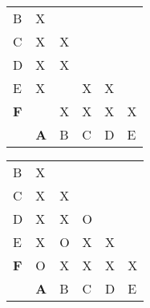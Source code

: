 \begin{figure}[t]

\begin{subfigure}[b]{.5\linewidth}
\centering
\begin{tabular}{llllll}
\cline{2-2}
\multicolumn{1}{l|}{B}          & \multicolumn{1}{l|}{X} &                        &                        &                        &                        \\ \cline{2-3}
\multicolumn{1}{l|}{C}          & \multicolumn{1}{l|}{X} & \multicolumn{1}{l|}{X} &                        &                        &                        \\ \cline{2-4}
\multicolumn{1}{l|}{D}          & \multicolumn{1}{l|}{X} & \multicolumn{1}{l|}{X} & \multicolumn{1}{l|}{}  &                        &                        \\ \cline{2-5}
\multicolumn{1}{l|}{E}          & \multicolumn{1}{l|}{X} & \multicolumn{1}{l|}{}  & \multicolumn{1}{l|}{X} & \multicolumn{1}{l|}{X} &                        \\ \cline{2-6}
\multicolumn{1}{l|}{\textbf{F}} & \multicolumn{1}{l|}{}  & \multicolumn{1}{l|}{X} & \multicolumn{1}{l|}{X} & \multicolumn{1}{l|}{X} & \multicolumn{1}{l|}{X} \\ \cline{2-6}
                                & \textbf{A}             & B                      & C                      & D                      & E
\end{tabular}
\caption{}
\label{min-tab-3}
\end{subfigure}
%
\begin{subfigure}[b]{.5\linewidth}
\centering
\begin{tabular}{llllll}
\cline{2-2}
\multicolumn{1}{l|}{B}          & \multicolumn{1}{l|}{X} &                        &                        &                        &                        \\ \cline{2-3}
\multicolumn{1}{l|}{C}          & \multicolumn{1}{l|}{X} & \multicolumn{1}{l|}{X} &                        &                        &                        \\ \cline{2-4}
\multicolumn{1}{l|}{D}          & \multicolumn{1}{l|}{X} & \multicolumn{1}{l|}{X} & \multicolumn{1}{l|}{O} &                        &                        \\ \cline{2-5}
\multicolumn{1}{l|}{E}          & \multicolumn{1}{l|}{X} & \multicolumn{1}{l|}{O} & \multicolumn{1}{l|}{X} & \multicolumn{1}{l|}{X} &                        \\ \cline{2-6}
\multicolumn{1}{l|}{\textbf{F}} & \multicolumn{1}{l|}{O} & \multicolumn{1}{l|}{X} & \multicolumn{1}{l|}{X} & \multicolumn{1}{l|}{X} & \multicolumn{1}{l|}{X} \\ \cline{2-6}
                                & \textbf{A}             & B                      & C                      & D                      & E
\end{tabular}
    \caption{}
    \label{min-tab-4}
\end{subfigure}

\caption{}
\end{figure}
 

